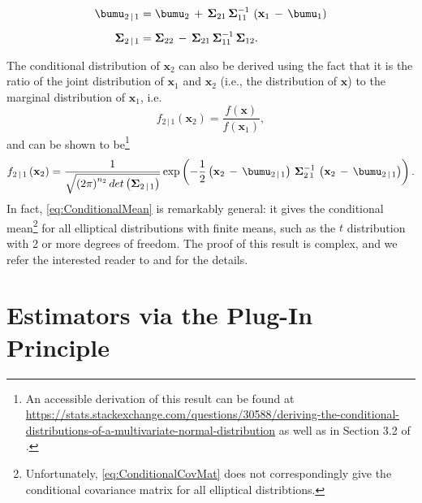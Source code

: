 \documentclass[graybox,envcountchap,sectrefs]{svmono}\usepackage[]{graphicx}\usepackage[]{xcolor}
\begin{document}
\begin{appendices}
\begin{subequations}
\begin{align}
\bumu_{2\,|\,1} & =\bumu_{2}\,+\,\mathbf{\Sigma}_{21}\mathrm{\,\mathbf{\Sigma}_{11}^{-1}}\,\left(\mathrm{\mathbf{x}}_{1}\,-\,\bumu_{1}\right)\label{eq:ConditionalMean}\\[0.5em]
\mathbf{\Sigma}_{2\,|\,1} & =\mathbf{\Sigma}_{22}\,-\,\mathbf{\Sigma}_{21}\,\mathrm{\mathbf{\Sigma}_{11}^{-1}}\,\mathbf{\Sigma}_{12}.\label{eq:ConditionalCovMat}
\end{align}
\end{subequations}

The conditional distribution of $\mathbf{x}_{2}$ can also be derived
using the fact that it is the ratio of the joint distribution of $\mathbf{x}_{1}$
and $\mathbf{x}_{2}$ (i.e., the distribution of $\mathbf{x}$) to
the marginal distribution of $\mathbf{x}_{1}$, i.e.
\begin{equation}
f_{2\,|\,1}\left(\mathbf{x}_{2}\right)=\frac{f\left(\mathbf{x}\right)}{f\left(\mathbf{x}_{1}\right)},\label{eq:MarginalDistributionX2}
\end{equation}
and can be shown to be\footnote{An accessible derivation of this result can be found at \url{https://stats.stackexchange.com/questions/30588/deriving-the-conditional-distributions-of-a-multivariate-normal-distribution}
as well as in Section 3.2 of \citet{MardiaKentBibby}.}
\begin{equation}
f_{2\,|\,1}\left(\mathbf{x}_{2}\right)=\frac{1}{\sqrt{\left(2\pi\right)^{n_{2}}det\left(\mathbf{\Sigma}_{2\,|\,1}\right)}}\exp\left(-\frac{1}{2}\left(\mathrm{\mathbf{x}}_{2}\,-\,\bumu_{2\,|\,1}\right)\,\mathbf{\Sigma}_{2\,1}^{-1}\,\left(\mathrm{\mathbf{x}}_{2}\,-\,\bumu_{2\,|\,1}\right)\right).\label{eq:MultivariateNormalDistribution4}
\end{equation}
In fact, \eqref{eq:ConditionalMean} is remarkably general: it gives
the conditional mean\footnote{Unfortunately, \eqref{eq:ConditionalCovMat} does not correspondingly
give the conditional covariance matrix for all elliptical distribtions.} for all elliptical distributions with finite means, such as the $t$
distribution with 2 or more degrees of freedom. The proof of this
result is complex, and we refer the interested reader to \citet{CambanisHuangSimons1981}
and \citet{Ding2016} for the details.

\section{Estimators via the Plug-In Principle}


\end{appendices}
\end{document}
